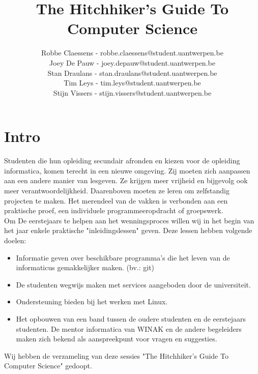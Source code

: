 \documentclass[a4paper]{article}
\begin{document}
	\title{The Hitchhiker's Guide To Computer Science}
	\author{
		Robbe Claessens - robbe.claessens@student.uantwerpen.be\\
		Joey De Pauw - joey.depauw@student.uantwerpen.be\\
		Stan Draulans - stan.draulans@student.uantwerpen.be\\
		Tim Leys - tim.leys@student.uantwerpen.be\\
		Stijn Vissers - stijn.vissers@student.uantwerpen.be
	}
	\date{}
	\maketitle
	
	\section{Intro}
		Studenten die hun opleiding secundair afronden en kiezen voor de opleiding informatica, komen terecht in een nieuwe omgeving. Zij moeten zich aanpassen aan een andere manier van lesgeven. Ze krijgen meer vrijheid en bijgevolg ook meer verantwoordelijkheid. Daarenboven moeten ze leren om zelfstandig projecten te maken. Het merendeel van de vakken is verbonden aan een praktische proef, een individuele programmeeropdracht of groepswerk. \\
		Om De eerstejaars te helpen aan het wenningsproces willen wij in het begin van het jaar enkele praktische "inleidingslessen" geven. Deze lessen hebben volgende doelen:
		\begin{itemize}
			\item Informatie geven over beschikbare programma's die het leven van de informaticus gemakkelijker maken. (bv.: git)
			\item De studenten wegwijs maken met services aangeboden door de universiteit.
			\item Ondersteuning bieden bij het werken met Linux.
			\item Het opbouwen van een band tussen de oudere studenten en de eerstejaars studenten. De mentor informatica van WINAK en de andere begeleiders maken zich bekend als aanspreekpunt voor vragen en suggesties.  
		\end{itemize} 
		Wij hebben de verzameling van deze sessies "The Hitchhiker's Guide To Computer Science" gedoopt.
		
\end{document}
